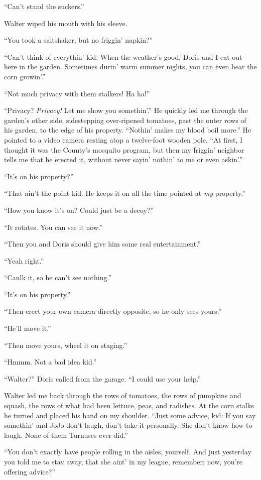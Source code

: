 ``Can't stand the suckers.''

Walter wiped his mouth with his sleeve.

``You took a saltshaker, but no friggin' napkin?''

``Can't think of everythin' kid. When the weather's good, Doris and I
eat out here in the garden. Sometimes durin' warm summer nights, you can
even hear the corn growin'.''

``Not much privacy with them stalkers! Ha ha!''

``Privacy? \emph{Privacy!} Let me show you somethin'.'' He quickly led
me through the garden's other side, sidestepping over-ripened tomatoes,
past the outer rows of his garden, to the edge of his property.
``Nothin' makes my blood boil more.'' He pointed to a video camera
resting atop a twelve-foot wooden pole. ``At first, I thought it was the
County's mosquito program, but then my friggin' neighbor tells me that
he erected it, without never sayin' nothin' to me or even askin'.''

``It's on his property?''

``That ain't the point kid. He keeps it on all the time pointed at
\emph{my} property.''

``How you know it's on? Could just be a decoy?''

``It rotates. You can see it now.''

``Then you and Doris should give him some real entertainment.''

``Yeah right.''

``Caulk it, so he can't see nothing.''

``It's on his property.''

``Then erect your own camera directly opposite, so he only sees yours.''

``He'll move it.''

``Then move yours, wheel it on staging.''

``Hmmm. Not a bad idea kid.''

``Walter?'' Doris called from the garage. ``I could use your help.''

Walter led me back through the rows of tomatoes, the rows of pumpkins
and squash, the rows of what had been lettuce, peas, and radishes. At
the corn stalks he turned and placed his hand on my shoulder. ``Just
some advice, kid: If you say somethin' and JoJo don't laugh, don't take
it personally. She don't know how to laugh. None of them Turnuses ever
did.''

``You don't exactly have people rolling in the aisles, yourself. And
just yesterday you told me to stay away, that she aint' in my league,
remember; now, you're offering advice?''

